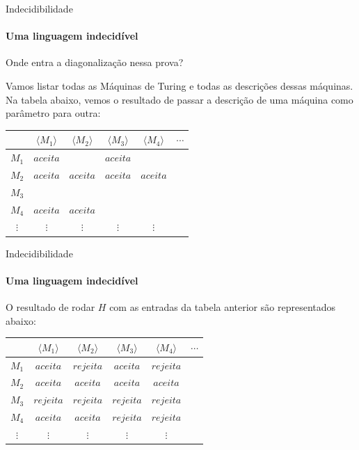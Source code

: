 \documentclass{beamer}
\begin{document}
\begin{frame}{Indecidibilidade}
	\framesubtitle{Uma linguagem indecidível}
	Onde entra a diagonalização nessa prova?\pause
	
	Vamos listar todas as Máquinas de Turing e todas as descrições dessas máquinas. Na tabela abaixo, vemos o resultado de passar a descrição de uma máquina como parâmetro para outra:
	
	\begin{table}[!b]
		{\carlitoTLF
			\begin{tabular}{c|ccccc}
				& \textbf{$\langle M_{1}\rangle$} & \textbf{$\langle M_{2}\rangle$} & \textbf{$\langle M_{3}\rangle$} & \textbf{$\langle M_{4}\rangle$} & $\cdots$ \\
				\hline
				$M_{1}$ & $aceita$ & & $aceita$ & & \\
				$M_{2}$ & $aceita$ & $aceita$ & $aceita$ & $aceita$ & \\
				$M_{3}$ & & & & & \\
				$M_{4}$ & $aceita$ & $aceita$ & & & \\
				$\vdots$ & $\vdots$ & $\vdots$ & $\vdots$ & $\vdots$ & \\
			\end{tabular}}
		\end{table}
\end{frame}
\begin{frame}{Indecidibilidade}
	\framesubtitle{Uma linguagem indecidível}
	O resultado de rodar $H$ com as entradas da tabela anterior são representados abaixo:
	
\begin{table}[!b]
	{\carlitoTLF
		\begin{tabular}{c|ccccc}
			& \textbf{$\langle M_{1}\rangle$} & \textbf{$\langle M_{2}\rangle$} & \textbf{$\langle M_{3}\rangle$} & \textbf{$\langle M_{4}\rangle$} & $\cdots$ \\
			\hline
			$M_{1}$ & $aceita$ & $rejeita$ & $aceita$ & $rejeita$ & \\
			$M_{2}$ & $aceita$ & $aceita$ & $aceita$ & $aceita$ & \\
			$M_{3}$ & $rejeita$ & $rejeita$ & $rejeita$ & $rejeita$ & \\
			$M_{4}$ & $aceita$ & $aceita$ & $rejeita$ & $rejeita$ & \\
			$\vdots$ & $\vdots$ & $\vdots$ & $\vdots$ & $\vdots$ & \\
		\end{tabular}}
	\end{table}
\end{frame}
\end{document}

